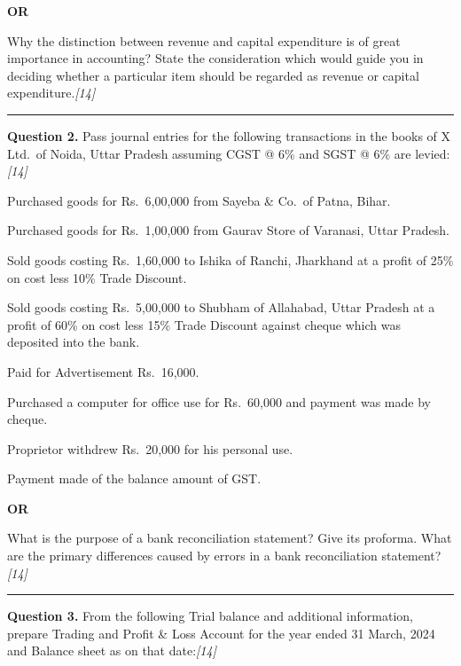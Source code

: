 \documentclass[11pt,a4paper]{article}
\newcommand{\pts}[1]{\hfill   \textit{[#1]}}
\begin{document}
\centerline{   \textbf{OR}}

Why the distinction between revenue and capital expenditure is of great importance in accounting? State the consideration which would guide you in deciding whether a particular item should be regarded as revenue or capital expenditure.\pts{14}

\medskip\rule{\linewidth}{0.2pt}




\noindent   \textbf{Question 2.}
Pass journal entries for the following transactions in the books of X Ltd.\ of Noida, Uttar Pradesh assuming CGST @ 6\% and SGST @ 6\% are levied:\pts{14}

\begin{parts}
  \item Purchased goods for Rs.\ 6,00,000 from Sayeba \& Co.\ of Patna, Bihar.
  \item Purchased goods for Rs.\ 1,00,000 from Gaurav Store of Varanasi, Uttar Pradesh.
  \item Sold goods costing Rs.\ 1,60,000 to Ishika of Ranchi, Jharkhand at a profit of 25\% on cost less 10\% Trade Discount.
  \item Sold goods costing Rs.\ 5,00,000 to Shubham of Allahabad, Uttar Pradesh at a profit of 60\% on cost less 15\% Trade Discount against cheque which was deposited into the bank.
  \item Paid for Advertisement Rs.\ 16,000.
  \item Purchased a computer for office use for Rs.\ 60,000 and payment was made by cheque.
  \item Proprietor withdrew Rs.\ 20,000 for his personal use.
  \item Payment made of the balance amount of GST.
\end{parts}

\centerline{   \textbf{OR}}

What is the purpose of a bank reconciliation statement? Give its proforma. What are the primary differences caused by errors in a bank reconciliation statement?\pts{14}

\medskip\rule{\linewidth}{0.2pt}




\noindent   \textbf{Question 3.}
From the following Trial balance and additional information, prepare Trading and Profit \& Loss Account for the year ended 31 March, 2024 and Balance sheet as on that date:\pts{14}
\end{document}
